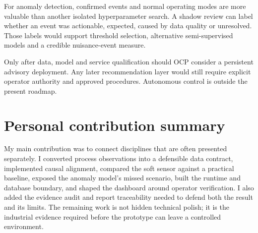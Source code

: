 For anomaly detection, confirmed events and normal operating modes are more valuable than another isolated hyperparameter search. A shadow review can label whether an event was actionable, expected, caused by data quality or unresolved. Those labels would support threshold selection, alternative semi-supervised models and a credible nuisance-event measure.

Only after data, model and service qualification should OCP consider a persistent advisory deployment. Any later recommendation layer would still require explicit operator authority and approved procedures. Autonomous control is outside the present roadmap.

\section{Personal contribution summary}

My main contribution was to connect disciplines that are often presented separately. I converted process observations into a defensible data contract, implemented causal alignment, compared the soft sensor against a practical baseline, exposed the anomaly model's missed scenario, built the runtime and database boundary, and shaped the dashboard around operator verification. I also added the evidence audit and report traceability needed to defend both the result and its limits. The remaining work is not hidden technical polish; it is the industrial evidence required before the prototype can leave a controlled environment.
